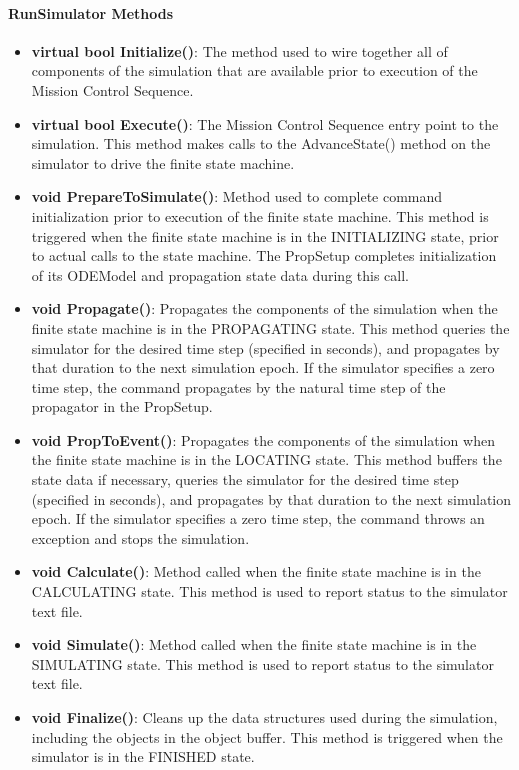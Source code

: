 \paragraph{RunSimulator Methods}

\begin{itemize}
\item \textbf{virtual bool Initialize()}:  The method used to wire together all of components of the simulation that are available prior to execution of the Mission Control Sequence.
\item \textbf{virtual bool Execute()}:  The Mission Control Sequence entry point to the simulation.  This method makes calls to the AdvanceState() method on the simulator to drive the finite state machine.
\item \textbf{void PrepareToSimulate()}:  Method used to complete command initialization prior to execution of the finite state machine.  This method is triggered when the finite state machine is in the INITIALIZING state, prior to actual calls to the state machine.  The PropSetup completes initialization of its ODEModel and propagation state data during this call.
\item \textbf{void Propagate()}:  Propagates the components of the simulation when the finite state machine is in the PROPAGATING state.  This method queries the simulator for the desired time step (specified in seconds), and propagates by that duration to the next simulation epoch.  If the simulator specifies a zero time step, the command propagates by the natural time step of the propagator in the PropSetup.
\item \textbf{void PropToEvent()}:  Propagates the components of the simulation when the finite state machine is in the LOCATING state.  This method buffers the state data if necessary, queries the simulator for the desired time step (specified in seconds), and propagates by that duration to the next simulation epoch.  If the simulator specifies a zero time step, the command throws an exception and stops the simulation.
\item \textbf{void Calculate()}:  Method called when the finite state machine is in the CALCULATING state. This method is used to report status to the simulator text file.
\item \textbf{void Simulate()}:  Method called when the finite state machine is in the SIMULATING state. This method is used to report status to the simulator text file.
\item \textbf{void Finalize()}:  Cleans up the data structures used during the simulation, including the objects in the object buffer.  This method is triggered when the simulator is in the FINISHED state.
\end{itemize}
